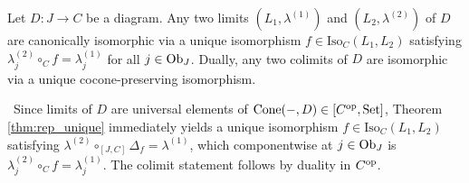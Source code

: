 \documentclass[10pt,a4paper]{article}
\begin{document}
\begin{theorem}\label{thm:limit_unique}
Let $D : J \to C$ be a diagram. Any two limits $(L_1, \lambda^{(1)})$ and $(L_2, \lambda^{(2)})$ of $D$ are canonically isomorphic via a unique isomorphism $f \in \mathrm{Iso}_C(L_1, L_2)$ satisfying $\lambda^{(2)}_j \circ_C f = \lambda^{(1)}_j$ for all $j \in {\textrm{Ob}}_J$. Dually, any two colimits of $D$ are isomorphic via a unique cocone-preserving isomorphism.
\end{theorem}
\myprf\ Since limits of $D$ are universal elements of $\mathrm{Cone}(-, D) \in [C^{\textrm{op}}, {\textrm{Set}}]$, Theorem \ref{thm:rep_unique} immediately yields a unique isomorphism $f \in \mathrm{Iso}_C(L_1, L_2)$ satisfying $\lambda^{(2)} \circ_{[J,C]} \Delta_f = \lambda^{(1)}$, which componentwise at $j \in {\textrm{Ob}}_J$ is $\lambda^{(2)}_j \circ_C f = \lambda^{(1)}_j$. The colimit statement follows by duality in $C^{\textrm{op}}$. \myqed
\end{document}
